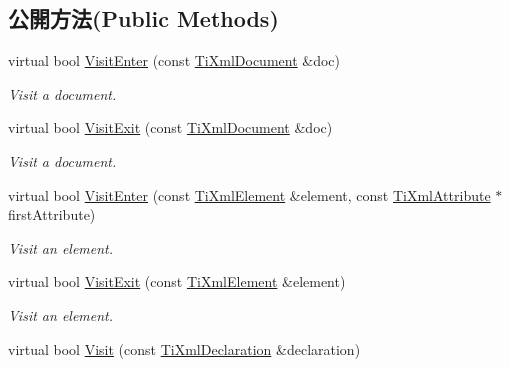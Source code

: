 \subsection*{公開方法(Public Methods)}
\begin{DoxyCompactItemize}
\item 
virtual bool \hyperlink{class_ti_xml_printer_a2ec73087db26ff4d2c4316c56f861db7}{Visit\+Enter} (const \hyperlink{class_ti_xml_document}{Ti\+Xml\+Document} \&doc)\hypertarget{class_ti_xml_printer_a2ec73087db26ff4d2c4316c56f861db7}{}\label{class_ti_xml_printer_a2ec73087db26ff4d2c4316c56f861db7}

\begin{DoxyCompactList}\small\item\em Visit a document. \end{DoxyCompactList}\item 
virtual bool \hyperlink{class_ti_xml_printer_a0a636046fa589b6d7f3e5bd025b3f33e}{Visit\+Exit} (const \hyperlink{class_ti_xml_document}{Ti\+Xml\+Document} \&doc)\hypertarget{class_ti_xml_printer_a0a636046fa589b6d7f3e5bd025b3f33e}{}\label{class_ti_xml_printer_a0a636046fa589b6d7f3e5bd025b3f33e}

\begin{DoxyCompactList}\small\item\em Visit a document. \end{DoxyCompactList}\item 
virtual bool \hyperlink{class_ti_xml_printer_a6dccaf5ee4979f13877690afe28721e8}{Visit\+Enter} (const \hyperlink{class_ti_xml_element}{Ti\+Xml\+Element} \&element, const \hyperlink{class_ti_xml_attribute}{Ti\+Xml\+Attribute} $\ast$first\+Attribute)\hypertarget{class_ti_xml_printer_a6dccaf5ee4979f13877690afe28721e8}{}\label{class_ti_xml_printer_a6dccaf5ee4979f13877690afe28721e8}

\begin{DoxyCompactList}\small\item\em Visit an element. \end{DoxyCompactList}\item 
virtual bool \hyperlink{class_ti_xml_printer_ae6a1df8271df4bf62d7873c38e34aa69}{Visit\+Exit} (const \hyperlink{class_ti_xml_element}{Ti\+Xml\+Element} \&element)\hypertarget{class_ti_xml_printer_ae6a1df8271df4bf62d7873c38e34aa69}{}\label{class_ti_xml_printer_ae6a1df8271df4bf62d7873c38e34aa69}

\begin{DoxyCompactList}\small\item\em Visit an element. \end{DoxyCompactList}\item 
virtual bool \hyperlink{class_ti_xml_printer_adaf7eec4dc43ad071ff52b60361574f5}{Visit} (const \hyperlink{class_ti_xml_declaration}{Ti\+Xml\+Declaration} \&declaration)\hypertarget{class_ti_xml_printer_adaf7eec4dc43ad071ff52b60361574f5}{}\label{class_ti_xml_printer_adaf7eec4dc43ad071ff52b60361574f5}


\end{DoxyCompactItemize}
